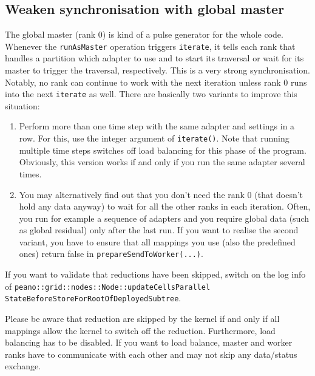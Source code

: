 \subsection{Weaken synchronisation with global master}

The global master (rank 0) is kind of a pulse generator for the whole code. 
Whenever the \texttt{runAsMaster} operation triggers \texttt{iterate}, it tells
each rank that handles a partition which adapter to use and to start its
traversal or wait for its master to trigger the traversal, respectively.
This is a very strong synchronisation.
Notably, no rank can continue to work with the next iteration unless rank 0 runs
into the next \texttt{iterate} as well.
There are basically two variants to improve this situation:

\begin{enumerate}
  \item Perform more than one time step with the same adapter and settings in a
  row. For this, use the integer argument of \texttt{iterate()}. Note that
  running multiple time steps switches off load balancing for this phase of the program.
  Obviously, this version works if and only if you run the same adapter several 
  times.
  \item You may alternatively find out that you don't need the rank 0 (that
  doesn't hold any data anyway) to wait for all the other ranks in each
  iteration. Often, you run for example a sequence of adapters and you require
  global data (such as global residual) only after the last run. 
  If you want to realise the second variant, you have to ensure that all
  mappings you use (also the predefined ones) return false in
  \texttt{prepareSendToWorker(...)}.
\end{enumerate}



\begin{remark}
  If you want to validate that reductions have been skipped, switch on the log
  info of 
  \texttt{peano::grid::nodes::Node::updateCellsParallel}
  \texttt{StateBeforeStoreForRootOfDeployedSubtree}.
\end{remark}


\noindent
Please be aware that reduction are skipped by the kernel if and only if all
mappings allow the kernel to switch off the reduction.
Furthermore, load balancing has to be disabled.
If you want to load balance, master and worker ranks have to communicate with
each other and may not skip any data/status exchange.


